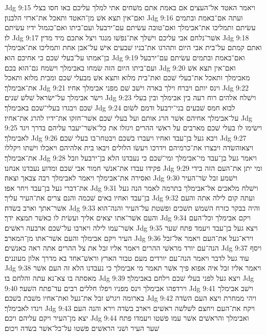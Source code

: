 Jdg 9:15  ויאמר האטד אל־העצים אם באמת אתם משׁחים אתי למלך עליכם באו חסו בצלי ואם־אין תצא אשׁ מן־האטד ותאכל את־ארזי הלבנון׃
Jdg 9:16  ועתה אם־באמת ובתמים עשׂיתם ותמליכו את־אבימלך ואם־טובה עשׂיתם עם־ירבעל ועם־ביתו ואם־כגמול ידיו עשׂיתם לו׃
Jdg 9:17  אשׁר־נלחם אבי עליכם וישׁלך את־נפשׁו מנגד ויצל אתכם מיד מדין׃
Jdg 9:18  ואתם קמתם על־בית אבי היום ותהרגו את־בניו שׁבעים אישׁ על־אבן אחת ותמליכו את־אבימלך בן־אמתו על־בעלי שׁכם כי אחיכם הוא׃
Jdg 9:19  ואם־באמת ובתמים עשׂיתם עם־ירבעל ועם־ביתו היום הזה שׂמחו באבימלך וישׂמח גם־הוא בכם׃
Jdg 9:20  ואם־אין תצא אשׁ מאבימלך ותאכל את־בעלי שׁכם ואת־בית מלוא ותצא אשׁ מבעלי שׁכם ומבית מלוא ותאכל את־אבימלך׃
Jdg 9:21  וינס יותם ויברח וילך בארה וישׁב שׁם מפני אבימלך אחיו׃
Jdg 9:22  וישׂר אבימלך על־ישׂראל שׁלשׁ שׁנים׃
Jdg 9:23  וישׁלח אלהים רוח רעה בין אבימלך ובין בעלי שׁכם ויבגדו בעלי־שׁכם באבימלך׃
Jdg 9:24  לבוא חמס שׁבעים בני־ירבעל ודמם לשׂום על־אבימלך אחיהם אשׁר הרג אותם ועל בעלי שׁכם אשׁר־חזקו את־ידיו להרג את־אחיו׃
Jdg 9:25  וישׂימו לו בעלי שׁכם מארבים על ראשׁי ההרים ויגזלו את כל־אשׁר־יעבר עליהם בדרך ויגד לאבימלך׃
Jdg 9:26  ויבא געל בן־עבד ואחיו ויעברו בשׁכם ויבטחו־בו בעלי שׁכם׃
Jdg 9:27  ויצאוהשׂדה ויבצרו את־כרמיהם וידרכו ויעשׂו הלולים ויבאו בית אלהיהם ויאכלו וישׁתו ויקללו את־אבימלך׃
Jdg 9:28  ויאמר געל בן־עבד מי־אבימלך ומי־שׁכם כי נעבדנו הלא בן־ירבעל וזבל פקידו עבדו את־אנשׁי חמור אבי שׁכם ומדוע נעבדנו אנחנו׃
Jdg 9:29  ומי יתן את־העם הזה בידי ואסירה את־אבימלך ויאמר לאבימלך רבה צבאך וצאה׃
Jdg 9:30  וישׁמע זבל שׂר־העיר את־דברי געל בן־עבד ויחר אפו׃
Jdg 9:31  וישׁלח מלאכים אל־אבימלך בתרמה לאמר הנה געל בן־עבד ואחיו באים שׁכמה והנם צרים את־העיר עליך׃
Jdg 9:32  ועתה קום לילה אתה והעם אשׁר־אתך וארב בשׂדה׃
Jdg 9:33  והיה בבקר כזרח השׁמשׁ תשׁכים ופשׁטת על־העיר והנה־הוא והעם אשׁר־אתו יצאים אליך ועשׂית לו כאשׁר תמצא ידך׃
Jdg 9:34  ויקם אבימלך וכל־העם אשׁר־עמו לילה ויארבו על־שׁכם ארבעה ראשׁים׃
Jdg 9:35  ויצא געל בן־עבד ויעמד פתח שׁער העיר ויקם אבימלך והעם אשׁר־אתו מן־המארב׃
Jdg 9:36  וירא־געל את־העם ויאמר אל־זבל הנה־עם יורד מראשׁי ההרים ויאמר אליו זבל את צל ההרים אתה ראה כאנשׁים׃
Jdg 9:37  ויסף עוד געל לדבר ויאמר הנה־עם יורדים מעם טבור הארץ וראשׁ־אחד בא מדרך אלון מעוננים׃
Jdg 9:38  ויאמר אליו זבל איה אפוא פיך אשׁר תאמר מי אבימלך כי נעבדנו הלא זה העם אשׁר מאסתה בו צא־נא עתה והלחם בו׃
Jdg 9:39  ויצא געל לפני בעלי שׁכם וילחם באבימלך׃
Jdg 9:40  וירדפהו אבימלך וינס מפניו ויפלו חללים רבים עד־פתח השׁער׃
Jdg 9:41  וישׁב אבימלך בארומה ויגרשׁ זבל את־געל ואת־אחיו משׁבת בשׁכם׃
Jdg 9:42  ויהי ממחרת ויצא העם השׂדה ויגדו לאבימלך׃
Jdg 9:43  ויקח את־העם ויחצם לשׁלשׁה ראשׁים ויארב בשׂדה וירא והנה העם יצא מן־העיר ויקם עליהם ויכם׃
Jdg 9:44  ואבימלך והראשׁים אשׁר עמו פשׁטו ויעמדו פתח שׁער העיר ושׁני הראשׁים פשׁטו על־כל־אשׁר בשׂדה ויכום׃
